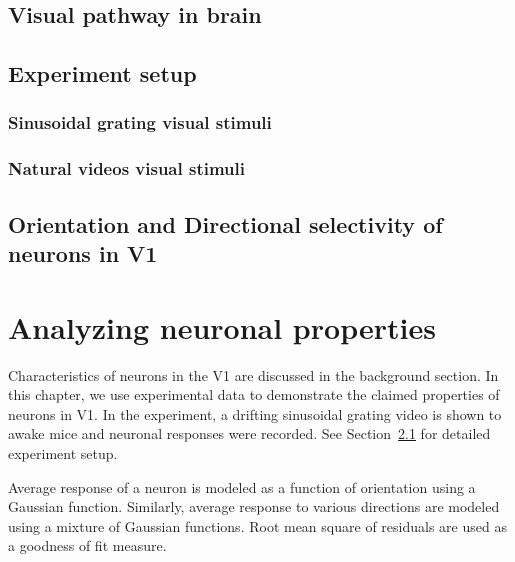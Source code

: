 \documentclass[MTech]{iitmdiss}
\begin{document}
\section{Visual pathway in brain} %
\label{sec:visual_pathway_in_brain}

\section{Experiment setup} %
\label{sec:experiment_setup}
\subsection{Sinusoidal grating visual stimuli} %
\label{sub:sinusoidal_grating_visual_stimuli}


\subsection{Natural videos visual stimuli} %
\label{sub:natural_videos_visual_stimuli}


\section{Orientation and Directional selectivity of neurons in V1} %
\label{sec:orientation_and_directional_selectivity_of_neurons_in_v1}


\chapter{Analyzing neuronal properties} %
\label{chap:searchmotif}
Characteristics of neurons in the V1 are discussed in the background section. In this chapter, we use experimental data to demonstrate the claimed properties of neurons in V1. In the experiment, a drifting sinusoidal grating video is shown to awake mice and neuronal responses were recorded. See Section~\ref{sub:sinusoidal_grating_visual_stimuli} for detailed experiment setup. 

Average response of a neuron is modeled as a function of orientation using a Gaussian function. Similarly, average response to various directions are modeled using a mixture of Gaussian functions. Root mean square of residuals are used as a goodness of fit measure.
\end{document}
